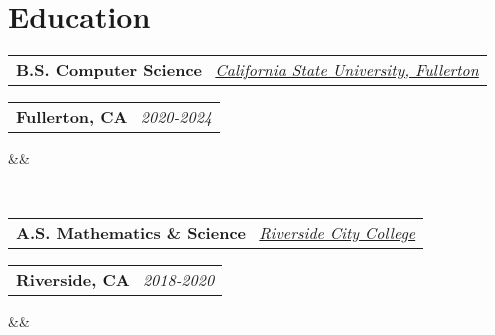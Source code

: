 \documentclass[11pt,a4paper,sans]{moderncv}
\makeatletter
\newcommand*{\customcventry}[7][.13em]{
\begin{tabular}{@{}l}
{\bfseries #4} \
{\itshape #3}
\end{tabular}
\hfill
\begin{tabular}{l@{}}
{\bfseries #5} \
{\itshape #2}
\end{tabular}
\ifx&#7&%
\else{\
\begin{minipage}{\maincolumnwidth}%
\small#7%
\end{minipage}}\fi%
\par\addvspace{#1}}
\makeatother
\begin{document}
\section{Education}
\customcventry{2020-2024}{\color{blue}\href{https://www.fullerton.edu/}{California State University, Fullerton}}{B.S. Computer Science}{Fullerton, CA}{}{}{\textbf{Relevant Courses:} Algorithms \& Data Structures, Web Frontend Engineering, Web Backend Engineering} \\
\customcventry{2018-2020}{\color{blue}\href{https://www.rcc.edu/index.html}{Riverside City College}}{A.S. Mathematics \& Science}{Riverside, CA}{}{}
\end{document}
